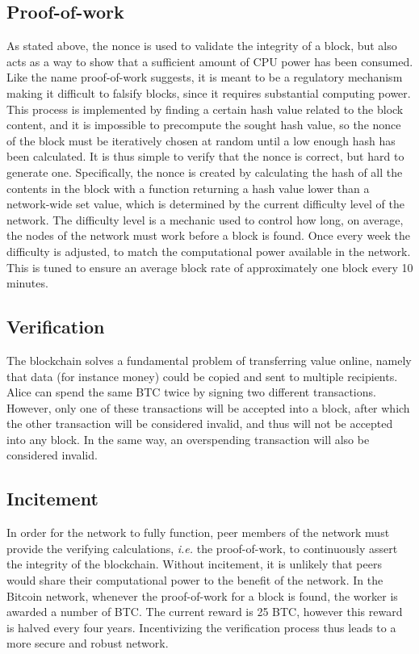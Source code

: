 \subsection{Proof-of-work}
As stated above, the nonce is used to validate the integrity of a block, but also acts as a way to show that a sufficient amount of CPU power has been consumed. Like the name proof-of-work suggests, it is meant to be a regulatory mechanism making it difficult to falsify blocks, since it requires substantial computing power. This process is implemented by finding a certain hash value related to the block content, and it is impossible to precompute the sought hash value, so the nonce of the block must be iteratively chosen at random until a low enough hash has been calculated. It is thus simple to verify that the nonce is correct, but hard to generate one. Specifically, the nonce is created by calculating the hash of all the contents in the block with a function returning a hash value lower than a network-wide set value, which is determined by the current difficulty level of the network. The difficulty level is a mechanic used to control how long, on average, the nodes of the network must work before a block is found. Once every week the difficulty is adjusted, to match the computational power available in the network. This is tuned to ensure an average block rate of approximately one block every 10 minutes. 

\subsection{Verification}
The blockchain solves a fundamental problem of transferring value online, namely that data (for instance money) could be copied and sent to multiple recipients. Alice can spend the same BTC twice by signing two different transactions. However, only one of these transactions will be accepted into a block, after which the other transaction will be considered invalid, and thus will not be accepted into any block. In the same way, an overspending transaction will also be considered invalid.

\subsection{Incitement}
In order for the network to fully function, peer members of the network must provide the verifying calculations, \textit{i.e.} the proof-of-work, to continuously assert the integrity of the blockchain. Without incitement, it is unlikely that peers would share their computational power to the benefit of the network. In the Bitcoin network, whenever the proof-of-work for a block is found, the worker is awarded a number of BTC. The current reward is 25 BTC, however this reward is halved every four years. Incentivizing the verification process thus leads to a more secure and robust network.

